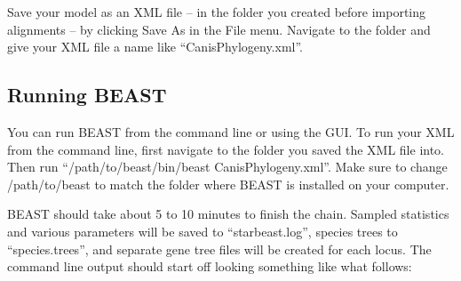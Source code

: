 \documentclass[12pt]{article}
\begin{document}
Save your model as an XML file -- in the folder you created before importing
alignments -- by clicking Save As in the File menu. Navigate to the folder
and give your XML file a name like ``CanisPhylogeny.xml''.

\subsection{Running BEAST}
\label{subsec:runningBEAST}

You can run BEAST from the command line or using the GUI. To run your XML
from the command line, first navigate to the folder you saved the XML file into.
Then run ``/path/to/beast/bin/beast CanisPhylogeny.xml''. Make sure to change
/path/to/beast to match the folder where BEAST is installed on your computer.

BEAST should take about 5 to 10 minutes to finish the chain. Sampled statistics
and various parameters will be saved to ``starbeast.log'', species trees to
``species.trees'', and separate gene tree files will be created for each locus. The command line
output should start off looking something like what follows:
\end{document}
